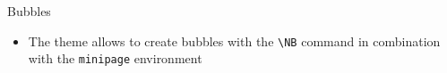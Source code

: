 \documentclass[10pt]{beamer}
\begin{document}

\begin{frame}
	{Bubbles}
	\begin{itemize}
		\item The theme allows to create bubbles with the \texttt{\textbackslash NB} command in combination with the \texttt{minipage} environment \bigskip
	\end{itemize}
	\begin{center}
		\begin{minipage}{.4\textwidth}
		\end{minipage}
	\end{center}
	\begin{center}
		\begin{minipage}{.6\textwidth}
		\end{minipage}
	\end{center}
	\begin{center}
		\begin{minipage}{.8\textwidth}
		\end{minipage}
	\end{center}
\end{frame}


\end{document}
